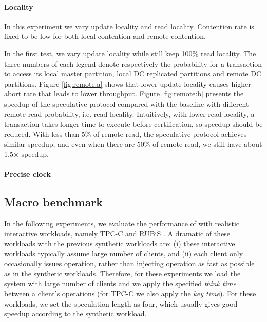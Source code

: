 \paragraph{Locality} In this experiment we vary update locality and read locality. Contention rate is fixed to be low for both local contention and remote contention.

In the first test, we vary update locality while still keep 100\% read locality. The three numbers of each legend denote respectively the probability for a transaction to access its local master partition, local DC replicated partitions and remote DC partitions. Figure \ref{fig:remote:a} shows that lower update locality causes higher abort rate that leads to lower throughput. Figure \ref{fig:remote:b} presents the speedup of the speculative protocol compared with the baseline with different remote read probability, i.e. read locality. Intuitively, with lower read locality, a transaction takes longer time to execute before certification, so speedup should be reduced. With less than 5\% of remote read, the speculative protocol achieves similar speedup, and even when there are 50\% of remote read, we still have about 1.5$\times$ speedup.

\paragraph{Precise clock} 


\subsection{Macro benchmark}
In the following experiments, we evaluate the performance of \specula with realistic interactive workloads, namely TPC-C\cite{tpcc} and RUBiS \cite{rubis}. A dramatic of these workloads with the previous synthetic workloads are: (i) these interactive workloads typically assume large number of clients, and (ii) each client only occasionally issues operation, rather than injecting operation as fast as possible as in the synthetic workloads. Therefore, for these experiments we load the system with large number of clients and we apply the specified \textit{think time} between a client's operations (for TPC-C we also apply the \textit{key time}). For these workloads, we set the speculation length as four, which usually gives good speedup according to the synthetic workload.


